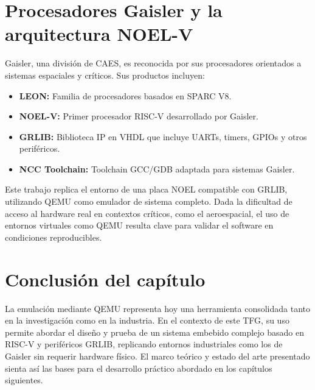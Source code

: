 
\section{Procesadores Gaisler y la arquitectura NOEL-V}
\label{subsec:gaisler-noelv}

Gaisler, una división de CAES, es reconocida por sus procesadores orientados a sistemas espaciales y críticos. Sus productos incluyen:

\begin{itemize}
    \item \textbf{LEON:} Familia de procesadores basados en SPARC V8.
    \item \textbf{NOEL-V:} Primer procesador RISC-V desarrollado por Gaisler.
    \item \textbf{GRLIB:} Biblioteca IP en VHDL que incluye UARTs, timers, GPIOs y otros periféricos.
    \item \textbf{NCC Toolchain:} Toolchain GCC/GDB adaptada para sistemas Gaisler.
\end{itemize}

Este trabajo replica el entorno de una placa NOEL compatible con GRLIB, utilizando QEMU como emulador de sistema completo. Dada la dificultad de acceso al hardware real en contextos críticos, como el aeroespacial, el uso de entornos virtuales como QEMU resulta clave para validar el software en condiciones reproducibles.

\section{Conclusión del capítulo}

La emulación mediante QEMU representa hoy una herramienta consolidada tanto en la investigación como en la industria. En el contexto de este TFG, su uso permite abordar el diseño y prueba de un sistema embebido complejo basado en RISC-V y periféricos GRLIB, replicando entornos industriales como los de Gaisler sin requerir hardware físico. El marco teórico y estado del arte presentado sienta así las bases para el desarrollo práctico abordado en los capítulos siguientes.
